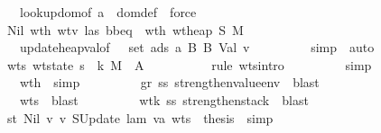 \begin{isabellebody}
\ \ \ \ \ \ \ \ \isamarkupfalse \ lookup{\isacharunderscore}dom{\isacharbrackleft}of\ a\ {\isasymSigma}{\isacharbrackright}\ dom{\isacharunderscore}def\ \isamarkupfalse \ force\ \isamarkupfalse \isanewline
\ \ \ \ \ \ \isamarkupfalse \ Nil\ wt{\isacharunderscore}h\ wtv{}\ las\ bbeq\ \isamarkupfalse \ wth{}{\isacharcolon}\ {\isachardoublequoteopen}wt{\isacharunderscore}heap\ {\isacharquery}S{}\ {\isacharquery}M{}\ {\isacharbraceleft}{\isacharbraceright}{\isachardoublequoteclose}\ \isanewline
\ \ \ \ \ \ \ \ \isamarkupfalse \ update{\isacharunderscore}heap{\isacharunderscore}val{\isacharbrackleft}of\ {\isasymSigma}\ {\isasymmu}\ {\isachardoublequoteopen}set\ ads{\isachardoublequoteclose}\ a\ B{\isacharprime}\ B{\isacharprime}\ {\isachardoublequoteopen}Val\ v{}{\isachardoublequoteclose}{\isacharbrackright}\isanewline
\ \ \ \ \ \ \ \ \isamarkupfalse \ simp\ \isamarkupfalse \ auto\ \isamarkupfalse \isanewline
\ \ \ \ \ \ \isamarkupfalse \ wts{}{\isacharcolon}\ {\isachardoublequoteopen}wt{\isacharunderscore}state\ {\isacharparenleft}s{\isacharprime}{\isacharcomma}\ {\isasymrho}{\isacharcomma}\ k{\isacharcomma}\ {\isacharquery}M{}{\isacharcomma}\ {\isacharbrackleft}{\isacharbrackright}{\isacharparenright}\ A{\isachardoublequoteclose}\ \isanewline
\ \ \ \ \ \ \ \ \isamarkupfalse \ {\isacharparenleft}rule\ wts{\isacharunderscore}intro{\isacharparenright}\isanewline
\ \ \ \ \ \ \ \ \isamarkupfalse \ simp\isanewline
\ \ \ \ \ \ \ \ \isamarkupfalse \ wth{}\ \isamarkupfalse \ simp\isanewline
\ \ \ \ \ \ \ \ \isamarkupfalse \ gr\ ss\ strengthen{\isacharunderscore}value{\isacharunderscore}env\ \isamarkupfalse \ blast\isanewline
\ \ \ \ \ \ \ \ \isamarkupfalse \ wts{}\ \isamarkupfalse \ blast\isanewline
\ \ \ \ \ \ \ \ \isamarkupfalse \ wt{\isacharunderscore}k\ ss\ strengthen{\isacharunderscore}stack\ \isamarkupfalse \ blast\isanewline
\ \ \ \ \ \ \ \ \isamarkupfalse \isanewline
\ \ \ \ \ \ \isamarkupfalse \ st\ Nil\ v{}\ v{}\ SUpdate\ lam\ v{}a\ wts{}\ \isamarkupfalse \ {\isacharquery}thesis\ \isamarkupfalse \ simp\isanewline

\end{isabellebody}
